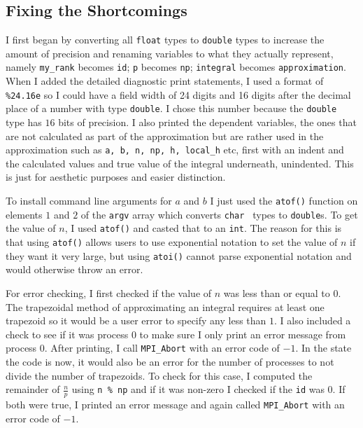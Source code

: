 \documentclass[11pt]{article}
\begin{document}
\subsection{Fixing the Shortcomings}
I first began by converting all \texttt{float} types to \texttt{double} types to increase the amount of precision and renaming variables to what they actually represent, namely \texttt{my\_rank} becomes \texttt{id}; \texttt{p} becomes \texttt{np}; \texttt{integral} becomes \texttt{approximation}. When I added the detailed diagnostic print statements, I used a format of \texttt{\%24.16e} so I could have a field width of 24 digits and 16 digits after the decimal place of a number with type \texttt{double}. I chose this number because the \texttt{double} type has $16$ bits of precision. I also printed the dependent variables, the ones that are not calculated as part of the approximation but are rather used in the approximation such as \texttt{a, b, n, np, h, local\_h} etc, first with an indent and the calculated values and true value of the integral underneath, unindented. This is just for aesthetic purposes and easier distinction.

To install command line arguments for $a$ and $b$ I just used the \texttt{atof()} function on elements $1$ and $2$ of the \texttt{argv} array which converts \texttt{char \*} types to \texttt{double}s. To get the value of $n$, I used \texttt{atof()} and casted that to an \texttt{int}. The reason for this is that using \texttt{atof()} allows users to use exponential notation to set the value of $n$ if they want it very large, but using \texttt{atoi()} cannot parse exponential notation and would otherwise throw an error.

For error checking, I first checked if the value of $n$ was less than or equal to $0$. The trapezoidal method of approximating an integral requires at least one trapezoid so it would be a user error to specify any less than $1$. I also included a check to see if it was process $0$ to make sure I only print an error message from process $0$. After printing, I call \texttt{MPI\_Abort} with an error code of $-1$. In the state the code is now, it would also be an error for the number of processes to not divide the number of trapezoids. To check for this case, I computed the remainder of $\frac{n}{p}$ using \texttt{n \% np} and if it was non-zero I checked if the \texttt{id} was $0$. If both were true, I printed an error message and again called \texttt{MPI\_Abort} with an error code of $-1$.
\end{document}
